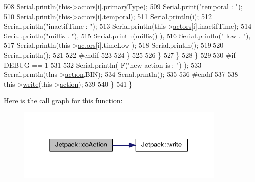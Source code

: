 \begin{DoxyCode}
508                         Serial.println(this->\hyperlink{class_jetpack_a7e16d2f97837f9712a2e6de1c50d99db}{actors}[i].primaryType);
509                         Serial.print(\textcolor{stringliteral}{"temporal : "});
510                         Serial.println(this->\hyperlink{class_jetpack_a7e16d2f97837f9712a2e6de1c50d99db}{actors}[i].temporal);
511                         Serial.println(i);
512                         Serial.println(\textcolor{stringliteral}{"inactifTime : "});
513                         Serial.println(this->\hyperlink{class_jetpack_a7e16d2f97837f9712a2e6de1c50d99db}{actors}[i].inactifTime);
514                         Serial.println(\textcolor{stringliteral}{"millis : "});
515                         Serial.println(millis() );
516                         Serial.println(\textcolor{stringliteral}{" low : "});
517                         Serial.println(this->\hyperlink{class_jetpack_a7e16d2f97837f9712a2e6de1c50d99db}{actors}[i].timeLow );
518                         Serial.println();
519 
520                         Serial.println();
521                     
522 \textcolor{preprocessor}{                    #endif}
523                 
524                     \}           
525             
526                 \}
527             \}
528         \}
529     
530 \textcolor{preprocessor}{    #if DEBUG == 1 }
531 
532         Serial.println( F(\textcolor{stringliteral}{"new action is : "}) );
533         Serial.println(this->\hyperlink{class_jetpack_aca3142925a7b0834b34ae91d26af7765}{action},BIN);
534         Serial.println();
535     
536 \textcolor{preprocessor}{    #endif }
537 
538         this->\hyperlink{class_jetpack_a338f1af8cbc6504ac69b47c7328569b5}{write}(this->\hyperlink{class_jetpack_aca3142925a7b0834b34ae91d26af7765}{action});
539 
540     \} 
541 \}
\end{DoxyCode}
Here is the call graph for this function\+:\nopagebreak
\begin{figure}[H]
\begin{center}
\leavevmode
\includegraphics[width=289pt]{df/d1d/class_jetpack_a9e703197093094b963f9ad57817495b8_cgraph}
\end{center}
\end{figure}
